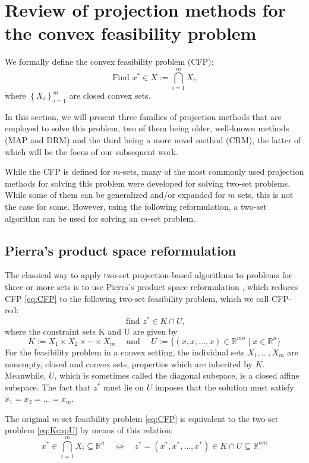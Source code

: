 \documentclass[smallextended,numbook,nospthms]{svjour3}
\theoremstyle{plain}
\theoremstyle{definition}
\def\RR{\mathds R}
\begin{document}
\newpage
\section{Review of projection methods for the convex feasibility problem}\label{sec:proj methods}

We formally define the convex feasibility problem (CFP):
\begin{equation}\label{eq:CFP}
	\text{ Find } x^{*} \in X:=\bigcap_{i=1}^{m} X_{i},
\end{equation}
where $\left\{X_{i}\right\}_{i=1}^{m}$ are closed convex sets.

In this section, we will present three families of projection methods that are employed to solve this problem, two of them being older, well-known methods (MAP and DRM) and the third being a more novel method (CRM), the latter of which will be the focus of our subsequent work.

While the CFP is defined for $m$-sets, many of the most commonly used projection methods for solving this problem were developed for solving two-set problems. While some of them can be generalized and/or expanded for $m$ sets, this is not the case for some. However, using the following reformulation, a two-set algorithm can be used for solving an $m$-set problem.

\subsection{Pierra's product space reformulation}\label{subsec:Pierra}
The classical way to apply two-set projection-based algorithms to problems for three or more sets is to use Pierra's product space reformulation \cite{Pierra:1984hl}, which reduces CFP \cref{eq:CFP} to the following two-set feasibility problem, which we call CFP-red:
\[
\text{ find } z^{*}\in K\cap U,  \label{eq:KcapU}
\]
where the constraint sets $\mathrm{K}$ and $\mathrm{U}$ are given by
\[
K:=X_{1} \times X_{2} \times \cdots \times X_{m} \quad \text { and } \quad U:=\{(x, x, \ldots, x) \in \RR^{mn} \mid x \in \RR^{n}\}
\]
For the feasibility problem in a convex setting, the individual sets $X_{1}, \ldots, X_{m}$ are nonempty, closed and convex sets, properties which are inherited by $K$. Meanwhile, $U$, which is sometimes called the diagonal subspace, is a closed affine subspace. The fact that $z^*$ must lie on $U$ imposes that the solution must satisfy $x_{1}=x_{2}=\dots=x_{m}$.

The original $m$-set feasibility problem \cref{eq:CFP} is equivalent to the two-set problem \cref{eq:KcapU} by means of this relation:
\begin{equation}
	x^{*} \in \bigcap_{i=1}^{m} X_{i} \subseteq \RR^n \quad \iff \quad z^{*}=(x^{*}, x^{*}, \ldots, x^{*}) \in K \cap U \subseteq \RR^{nm} \label{eq:Pierra}
\end{equation}
\end{document}
